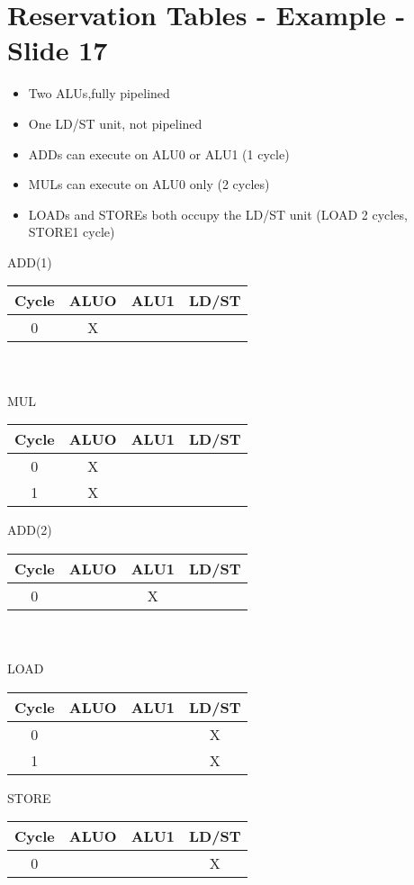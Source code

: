 \documentclass{report}
\begin{document}
\section{Reservation Tables - Example - Slide 17}
\vspace{-1em}
\begin{multicols}{2}
  \begin{itemize}
    \item Two ALUs,fully pipelined
    \item One LD/ST unit, not pipelined
    \item ADDs can execute on ALU0 or ALU1 (1 cycle)
    \item MULs can execute on ALU0 only (2 cycles)
    \item LOADs and STOREs both occupy the LD/ST unit
          (LOAD 2 cycles, STORE1 cycle)
  \end{itemize}
\end{multicols}
\vspace{-2em}
\begin{multicols}{3}
ADD(1) \\
\begin{tabular}{|c|c|c|c|}
  \hline
  Cycle & ALUO & ALU1 & LD/ST \\
  \hline
  0 & X    &      &       \\
  \hline
\end{tabular} \\ \ \\
MUL \\
\begin{tabular}{|c|c|c|c|}
  \hline
  Cycle & ALUO & ALU1 & LD/ST \\
  \hline
  0     & X    &      &       \\
  \hline
  1     & X    &      &       \\
  \hline
\end{tabular}
  \vfill\columnbreak
ADD(2) \\
\begin{tabular}{|c|c|c|c|}
  \hline
  Cycle & ALUO & ALU1 & LD/ST \\
  \hline
  0     &      & X    &       \\
  \hline
\end{tabular} \\ \ \\
LOAD \\
\begin{tabular}{|c|c|c|c|}
  \hline
  Cycle & ALUO & ALU1 & LD/ST \\
  \hline
  0    &       &      & X     \\
  \hline 
  1    &       &      & X     \\
  \hline
\end{tabular}
  \vfill\columnbreak
STORE \\
\begin{tabular}{|c|c|c|c|}
  \hline
  Cycle & ALUO & ALU1 & LD/ST \\
  \hline
  0     &      &      & X     \\
  \hline
\end{tabular}
\end{multicols}
\end{document}
